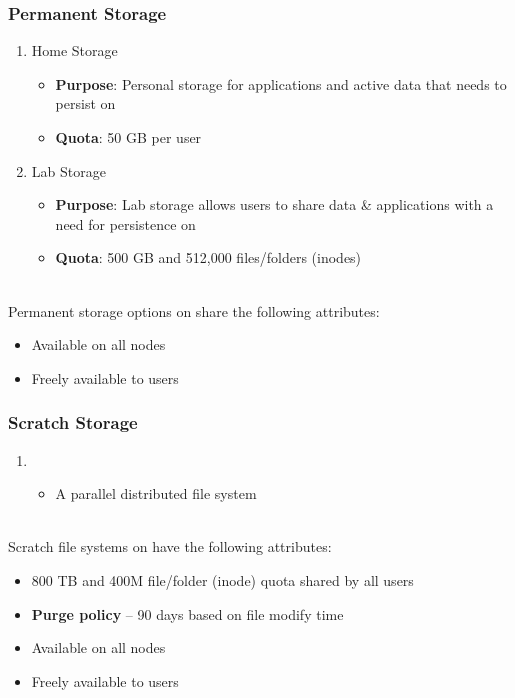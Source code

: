 \begin{frame}
  \frametitle{Permanent Storage}
  \begin{enumerate}
  \item Home Storage
    \begin{itemize}
    \item {\textbf{Purpose}}: Personal storage for applications and active data that needs to persist on {\mana}
		\item {\textbf{Quota}}: 50 GB per user
    \end{itemize}
  \item Lab Storage
    \begin{itemize}
    \item {\textbf{Purpose}}: Lab storage allows users to share data \& applications with a need for persistence on {\mana}
		\item {\textbf{Quota}}: 500 GB and 512,000 files/folders (inodes)
    \end{itemize}
  \end{enumerate}
~\\
  Permanent storage options on {\mana} share the following attributes:
  \begin{itemize}
  \item Available on all nodes
  \item Freely available to users
  \end{itemize}

\end{frame}


\begin{frame}
  \frametitle{Scratch Storage}
  \begin{enumerate}
    \item {\lustre}
      \begin{itemize}
			\item A parallel distributed file system 
      \end{itemize}
  \end{enumerate}
~\\
  Scratch file systems on {\mana} have the following attributes:
  \begin{itemize}
	\item 800 TB and 400M file/folder (inode) quota shared by all users
  \item \textbf{Purge policy} -- 90 days based on file modify time
  \item Available on all nodes
  \item Freely available to users
  \end{itemize}

\end{frame}



